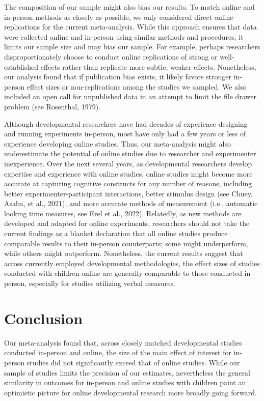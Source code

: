 \documentclass[
  man,floatsintext]{apa6}
\begin{document}
The composition of our sample might also bias our results. To match online and in-person methods as closely as possible, we only considered direct online replications for the current meta-analysis. While this approach ensures that data were collected online and in-person using similar methods and procedures, it limits our sample size and may bias our sample. For example, perhaps researchers disproportionately choose to conduct online replications of strong or well-established effects rather than replicate more subtle, weaker effects. Nonetheless, our analysis found that if publication bias exists, it likely favors stronger in-person effect sizes or non-replications among the studies we sampled. We also included an open call for unpublished data in an attempt to limit the file drawer problem (see Rosenthal, 1979).

Although developmental researchers have had decades of experience designing and running experiments in-person, most have only had a few years or less of experience developing online studies. Thus, our meta-analysis might also underestimate the potential of online studies due to researcher and experimenter inexperience. Over the next several years, as developmental researchers develop expertise and experience with online studies, online studies might become more accurate at capturing cognitive constructs for any number of reasons, including better experimenter-participant interactions, better stimulus design (see Chuey, Asaba, et al., 2021), and more accurate methods of measurement (i.e., automatic looking time measures, see Erel et al., 2022). Relatedly, as new methods are developed and adapted for online experiments, researchers should not take the current findings as a blanket declaration that all online studies produce comparable results to their in-person counterparts; some might underperform, while others might outperform. Nonetheless, the current results suggest that across currently employed developmental methodologies, the effect sizes of studies conducted with children online are generally comparable to those conducted in-person, especially for studies utilizing verbal measures.

\hypertarget{conclusion}{%
\section{Conclusion}\label{conclusion}}

Our meta-analysis found that, across closely matched developmental studies conducted in-person and online, the size of the main effect of interest for in-person studies did not significantly exceed that of online studies. While our sample of studies limits the precision of our estimates, nevertheless the general similarity in outcomes for in-person and online studies with children paint an optimistic picture for online developmental research more broadly going forward.
\end{document}
